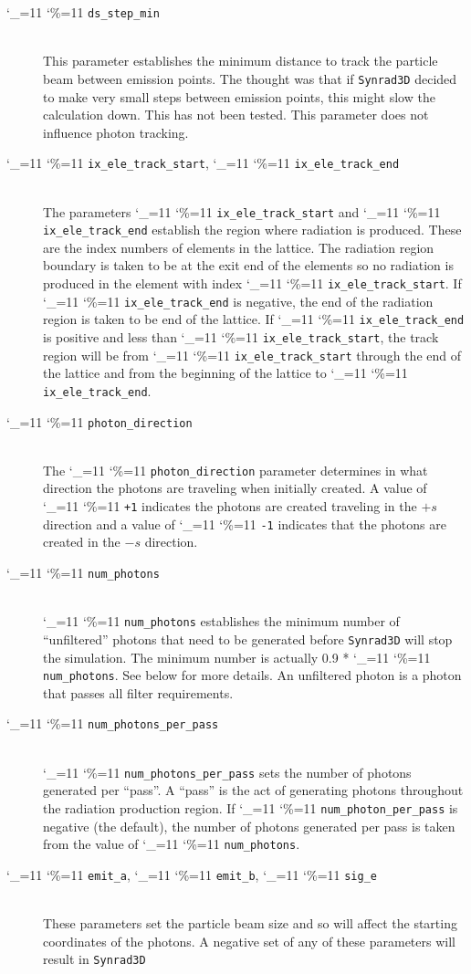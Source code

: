 \documentclass[11pt,openany]{report}
\newcommand{\srthree}{\texttt{Synrad3D}\xspace}
\newcommand\ttcmd{\begingroup\catcode`\_=11 \catcode`\%=11 \dottcmd}
\newcommand\dottcmd[1]{\texttt{#1}\endgroup}
\newcommand{\vn}{\ttcmd}
\newcommand{\Newline}{\hfil \\}
\begin{document}
  \begin{description}
  \item[\vn{ds_step_min}] \Newline
This parameter establishes the minimum distance to track the particle beam between emission
points. The thought was that if \srthree decided to make very small steps  between emission
points, this might slow the calculation down. This has not been tested. This parameter
does not influence photon tracking.
  \item[\vn{ix_ele_track_start}, \vn{ix_ele_track_end}] \Newline
The parameters \vn{ix_ele_track_start} and \vn{ix_ele_track_end} establish
the region where radiation is produced. These are the index numbers of 
elements in the lattice. The radiation region boundary is taken to be at
the exit end of the elements so no radiation is produced in the element
with index \vn{ix_ele_track_start}. If \vn{ix_ele_track_end} is negative,
the end of the radiation region is taken to be end of the lattice.
If \vn{ix_ele_track_end} is positive and less than \vn{ix_ele_track_start},
the track region will be from \vn{ix_ele_track_start} through the
end of the lattice and from the beginning of the lattice to \vn{ix_ele_track_end}.
  \item[\vn{photon_direction}] \Newline
The \vn{photon_direction} parameter determines in what direction the photons
are traveling when initially created. A value of \vn{+1} indicates the photons
are created traveling in the $+s$ direction and a value of \vn{-1} indicates
that the photons are created in the $-s$ direction.
  \item[\vn{num_photons}] \Newline
\vn{num_photons} establishes the minimum number of ``unfiltered''
photons that need to be generated before \srthree will stop the
simulation. The minimum number is actually 0.9 * \vn{num_photons}. See
below for more details. An unfiltered photon is a photon that passes
all filter requirements.  
  \item[\vn{num_photons_per_pass}] \Newline
\vn{num_photons_per_pass} sets the number of photons generated per
``pass''.  A ``pass'' is the act of generating photons throughout the
radiation production region. If \vn{num_photon_per_pass} is negative
(the default), the number of photons generated per pass is taken from
the value of \vn{num_photons}.
  \item[\vn{emit_a}, \vn{emit_b}, \vn{sig_e}] \Newline
These parameters set the particle beam size and so will affect the starting coordinates of
the photons. A negative set of any of these parameters will result in \srthree 

\end{description}
\end{document}
